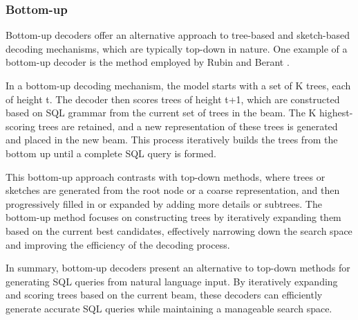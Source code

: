\subsubsection{Bottom-up}

Bottom-up decoders offer an alternative approach to tree-based and sketch-based decoding mechanisms, which are typically top-down in nature. One example of a bottom-up decoder is the method employed by Rubin and Berant \cite{rubin-berant-2021-smbop}.

In a bottom-up decoding mechanism, the model starts with a set of K trees, each of height t. The decoder then scores trees of height t+1, which are constructed based on SQL grammar from the current set of trees in the beam. The K highest-scoring trees are retained, and a new representation of these trees is generated and placed in the new beam. This process iteratively builds the trees from the bottom up until a complete SQL query is formed.

This bottom-up approach contrasts with top-down methods, where trees or sketches are generated from the root node or a coarse representation, and then progressively filled in or expanded by adding more details or subtrees. The bottom-up method focuses on constructing trees by iteratively expanding them based on the current best candidates, effectively narrowing down the search space and improving the efficiency of the decoding process.

In summary, bottom-up decoders present an alternative to top-down methods for generating SQL queries from natural language input. By iteratively expanding and scoring trees based on the current beam, these decoders can efficiently generate accurate SQL queries while maintaining a manageable search space.